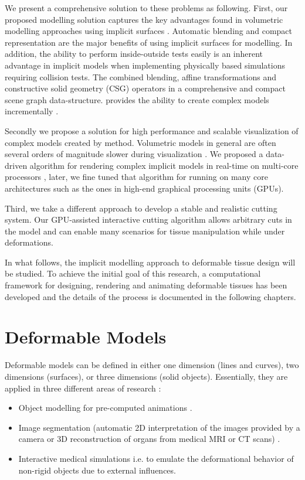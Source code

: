 We present a comprehensive solution to these problems as following. 
First, our proposed modelling solution captures the key advantages found in volumetric modelling approaches using 
implicit surfaces \cite{Bloomenthal1997, Wyvill1986, Wyvill1999, Wyvill1996, Wyvill1997, Schmidt2006, Bernhardt2010a}. Automatic blending and compact 
representation are the major benefits of using implicit surfaces for modelling. In addition, the ability to perform inside-outside tests 
easily is an inherent advantage in implicit models when implementing physically based simulations requiring collision tests. 
The \blob \cite{Wyvill1999} combined blending, affine transformations and constructive solid geometry (CSG) operators in a 
comprehensive and compact scene graph data-structure. \blob provides the ability to create complex models incrementally \cite{Schmidt2006}. 

Secondly we propose a solution for high performance and scalable visualization of complex models created by \blob method.
Volumetric models in general are often several orders of magnitude slower during visualization \cite{Bloomenthal1990a, Bloomenthal1997}.
We proposed a data-driven algorithm for rendering complex implicit models in real-time on multi-core processors \cite{Shirazian2012}, later, we 
fine tuned that algorithm for running on many core architectures such as the ones in high-end graphical processing units (GPUs). 

Third, we take a different approach to develop a stable and realistic cutting system. Our GPU-assisted interactive cutting algorithm allows
arbitrary cuts in the model and can enable many scenarios for tissue manipulation while under deformations. 

In what follows, the implicit modelling approach to deformable tissue design will be studied. To achieve the initial goal of this research, a
computational framework for designing, rendering and animating deformable tissues has been developed and the details of the process is documented 
in the following chapters. 


\section{Deformable Models}
Deformable models can be defined in either one dimension (lines and curves), two dimensions (surfaces), or three dimensions (solid objects). 
Essentially, they are applied in three different areas of research \cite{Meier2005}: 

\begin{itemize}
 \item Object modelling for pre-computed animations \cite{coquillart1990extended, hsu1992direct}.
 \item Image segmentation (automatic 2D interpretation of the images provided by a camera or 3D reconstruction of organs from medical MRI 
 or CT scans) \cite{neveu1994recovery}.
 \item Interactive medical simulations i.e. to emulate the deformational behavior of non-rigid objects due to external influences.
\end{itemize}

